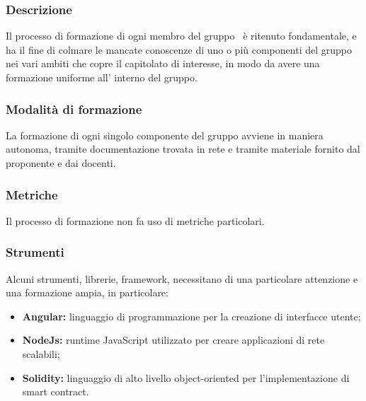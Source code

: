         \subsubsection {Descrizione}
        Il processo di formazione di ogni membro del gruppo \groupName\ è ritenuto fondamentale, e ha il fine di colmare le mancate conoscenze di uno o più componenti del gruppo nei vari ambiti che copre il capitolato di interesse, in modo da avere una formazione uniforme all' interno del gruppo.
        \subsubsection {Modalità di formazione}
        La formazione di ogni singolo componente del gruppo avviene in maniera autonoma, tramite documentazione trovata in rete e tramite materiale fornito dal proponente e dai docenti.
        \subsubsection {Metriche}
        Il processo di formazione non fa uso di metriche particolari.
        \subsubsection {Strumenti}
        Alcuni strumenti, librerie, framework, necessitano di una particolare attenzione e una formazione ampia, in particolare:
        \begin {itemize}
          \item \textbf{Angular:} linguaggio di programmazione per la creazione di interfacce utente;
          \item \textbf{NodeJs: } runtime JavaScript utilizzato per creare applicazioni di rete scalabili;
          \item \textbf{Solidity: } linguaggio di alto livello object-oriented per l'implementazione di smart contract\glo.
        \end {itemize}